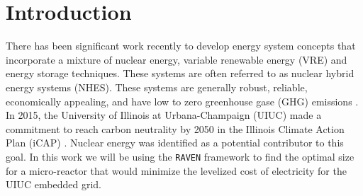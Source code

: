 \section{Introduction}

There has been significant work recently to develop energy system concepts that incorporate a mixture of nuclear energy, variable renewable energy (VRE) and energy storage techniques. These systems are often referred to as nuclear hybrid energy systems (NHES). These systems are generally robust, reliable, economically appealing, and have low to zero greenhouse gase (GHG) emissions \cite{baker_optimal_2018,ruth_nuclear-renewable_2014,ruth_economic_2016,suman_hybrid_2018-1}. In 2015, the University of Illinois at Urbana-Champaign (UIUC) made a commitment to reach carbon neutrality by 2050 in the Illinois Climate Action Plan (iCAP) \cite{isee_illinois_2015}. Nuclear energy was identified as a potential contributor to this goal. In this work we will be using the \texttt{RAVEN} framework to find the optimal size for a micro-reactor that would minimize the levelized cost of electricity for the UIUC embedded grid.